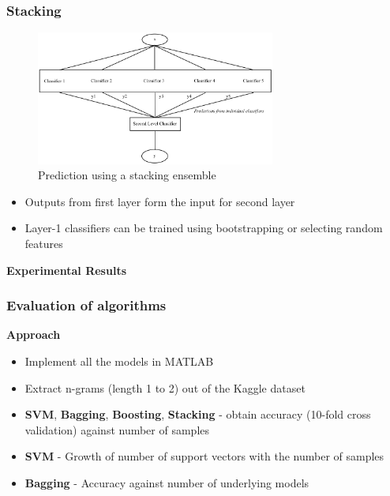 \documentclass{beamer}
\begin{document}
    \begin{frame}
        \frametitle{Stacking}
        \begin{figure}
            \centering
            \includegraphics[width=0.7\textwidth]{figures/stacking_prediction_flow.png}
            \caption{Prediction using a stacking ensemble}
        \end{figure}
        \begin{itemize}
            \item{Outputs from first layer form the input for second layer}
            \item{Layer-1 classifiers can be trained using bootstrapping or selecting random features}
        \end{itemize}
    \end{frame}
    
    \begin{frame}
        \begin{center}
            \textbf{Experimental Results}
        \end{center}
    \end{frame}
    
    \begin{frame}
        \frametitle{Evaluation of algorithms}
        \begin{center}
            \textbf{Approach}
        \end{center}
        \begin{itemize}
            \item{Implement all the models in MATLAB}
            \item{Extract n-grams (length 1 to 2) out of the Kaggle dataset}
            \item{\textbf{SVM}, \textbf{Bagging}, \textbf{Boosting}, \textbf{Stacking} - obtain accuracy (10-fold cross validation) against number of samples}
            \item{\textbf{SVM} - Growth of number of support vectors with the number of samples}
            \item{\textbf{Bagging} - Accuracy against number of underlying models}
        \end{itemize}
    \end{frame}
    
\end{document}
